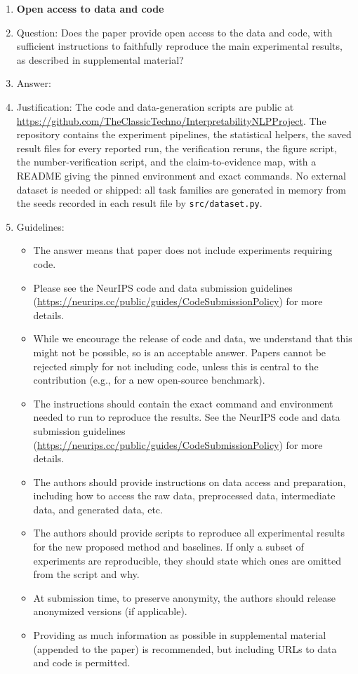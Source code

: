 \begin{enumerate}
\item {\bf Open access to data and code}
    \item[] Question: Does the paper provide open access to the data and code, with sufficient instructions to faithfully reproduce the main experimental results, as described in supplemental material?
    \item[] Answer: \answerYes{}
    \item[] Justification: The code and data-generation scripts are public at \url{https://github.com/TheClassicTechno/InterpretabilityNLPProject}. The repository contains the experiment pipelines, the statistical helpers, the saved result files for every reported run, the verification reruns, the figure script, the number-verification script, and the claim-to-evidence map, with a README giving the pinned environment and exact commands. No external dataset is needed or shipped: all task families are generated in memory from the seeds recorded in each result file by \texttt{src/dataset.py}.
    \item[] Guidelines:
    \begin{itemize}
        \item The answer \answerNA{} means that paper does not include experiments requiring code.
        \item Please see the NeurIPS code and data submission guidelines (\url{https://neurips.cc/public/guides/CodeSubmissionPolicy}) for more details.
        \item While we encourage the release of code and data, we understand that this might not be possible, so \answerNo{} is an acceptable answer. Papers cannot be rejected simply for not including code, unless this is central to the contribution (e.g., for a new open-source benchmark).
        \item The instructions should contain the exact command and environment needed to run to reproduce the results. See the NeurIPS code and data submission guidelines (\url{https://neurips.cc/public/guides/CodeSubmissionPolicy}) for more details.
        \item The authors should provide instructions on data access and preparation, including how to access the raw data, preprocessed data, intermediate data, and generated data, etc.
        \item The authors should provide scripts to reproduce all experimental results for the new proposed method and baselines. If only a subset of experiments are reproducible, they should state which ones are omitted from the script and why.
        \item At submission time, to preserve anonymity, the authors should release anonymized versions (if applicable).
        \item Providing as much information as possible in supplemental material (appended to the paper) is recommended, but including URLs to data and code is permitted.
    \end{itemize}



\end{enumerate}
